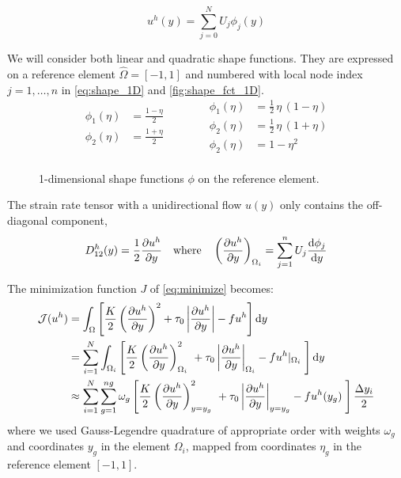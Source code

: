 \documentclass[11 pt]{report}
\begin{document}
\begin{equation}
        u^h(y) = \sum_{j=0}^N U_j \phi_j(y)
\end{equation}

We will consider both linear and quadratic shape functions. They are expressed on a reference element $\hat \Omega = [-1, 1]$ and numbered with local node index $j=1,\dots,n$ in \autoref{eq:shape_1D} and \autoref{fig:shape_fct_1D}.
\begin{equation}
    \begin{split}
        \phi_1(\eta) &= \frac{1-\eta}{2}\\
        \phi_2(\eta) &= \frac{1+\eta}{2}\\
    \end{split}
    \hspace{40pt}
    \begin{split}
        \phi_1(\eta) &= \frac{1}{2} \, \eta \, (1-\eta)\\
        \phi_2(\eta) &= \frac{1}{2} \, \eta \, (1+\eta)\\
        \phi_2(\eta) &= 1 - \eta^2\\
    \end{split}
    \label{eq:shape_1D}
\end{equation}

\begin{figure}[ht]
    \centering
    
    \caption{1-dimensional shape functions $\phi$ on the reference element.}
    \label{fig:shape_fct_1D}
\end{figure}


The strain rate tensor with a unidirectional flow $u(y)$ only contains the off-diagonal component,
\begin{equation}
    D_{12}^h(y) = \frac{1}{2} \pdv{u^h}{y} \quad \text{where} \quad \left(\pdv{u^h}{y}\right)_{\Omega_i} = \sum_{j=1}^{n} U_j \dv{\phi_j}{y}
\end{equation}

The minimization function $J$ of \autoref{eq:minimize} becomes:
\begin{equation}
\begin{aligned}
    \mathcal{J}(u^h) &= \int_{\Omega} \left[ \frac{K}{2} \left(\pdv{u^h}{y}\right)^2 + \tau_0 \left|\pdv{u^h}{y}\right| - f u^h \right] \dd y\\
    &= \sum_{i=1}^N \int_{\Omega_i} \left[\frac{K}{2}  \left(\pdv{u^h}{y}\right)^2_{\Omega_i} \ + \tau_0 \left|\pdv{u^h}{y}\right|_{\Omega_i} - f u^h\vert_{\Omega_i} \; \right] \dd y\\
    &\approx \sum_{i=1}^N \sum_{g=1}^{ng} \omega_{g} \left[\frac{K}{2}  \left(\pdv{u^h}{y}\right)^2_{y=y_g} \ + \tau_0 \left|\pdv{u^h}{y}\right|_{y=y_g} - f u^h(y_g) \; \right] \frac{\Delta y_i}{2}
\end{aligned}
\end{equation}
where we used Gauss-Legendre quadrature of appropriate order with weights $\omega_g$ and coordinates $y_g$ in the element $\Omega_i$, mapped from coordinates $\eta_g$ in the reference element $[-1,1]$.
\end{document}
